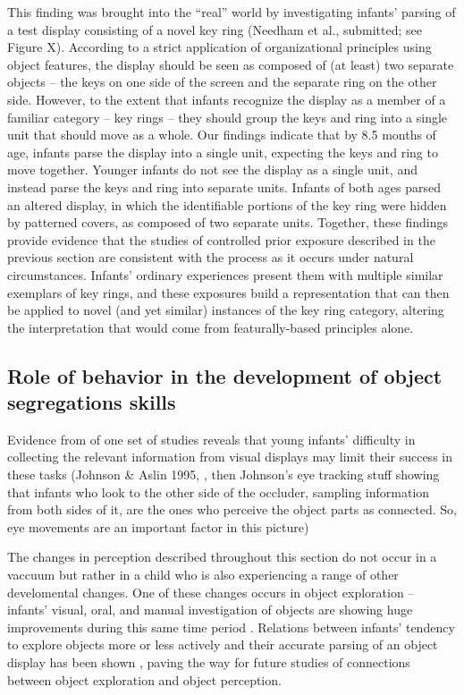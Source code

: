 This finding was brought into the ``real'' world by investigating
infants' parsing of a test display consisting of a novel key
ring (Needham et al., submitted; see Figure X).  According to a strict
application of organizational principles using object features, the
display should be seen as composed of (at least) two separate
objects -- the keys on one side of the screen and the separate
ring on the other side.  However, to the extent that infants recognize
the display as a member of a familiar category -- key
rings -- they should group the keys and ring into a single unit
that should move as a whole.  Our findings indicate that by 8.5 months
of age, infants parse the display into a single unit, expecting the
keys and ring to move together.  Younger infants do not see the
display as a single unit, and instead parse the keys and ring into
separate units.  Infants of both ages parsed an altered display, in
which the identifiable portions of the key ring were hidden by
patterned covers, as composed of two separate units.  Together, these
findings provide evidence that the studies of controlled prior
exposure described in the previous section are consistent with the
process as it occurs under natural circumstances.  Infants'
ordinary experiences present them with multiple similar exemplars of
key rings, and these exposures build a representation that can then be
applied to novel (and yet similar) instances of the key ring category,
altering the interpretation that would come from featurally-based
principles alone.




\subsection{Role of behavior in the development of object segregations skills}

Evidence from of one set of studies reveals that young
infants' difficulty in collecting the relevant information
from visual displays may limit their success in these tasks (Johnson \&
Aslin 1995, \cite{johnson96perception}, then Johnson's eye tracking stuff
\cite{johnson04where} showing
that infants who look to the other side of the occluder, sampling
information from both sides of it, are the ones who perceive the
object parts as connected.  So, eye movements are an important factor
in this picture)

The changes in perception described throughout this section
do not occur in a vaccuum but rather in a
child who is also experiencing a range of other develomental changes.
One of these changes occurs in object
exploration -- infants' visual, oral, and manual
investigation of objects are showing huge improvements during this
same time period \cite{rochat89object}.  Relations between infants'
tendency to explore objects more or less actively and their accurate
parsing of an object display has been shown \cite{needham00improvements}, paving
the way for future studies of connections between object exploration
and object perception.





